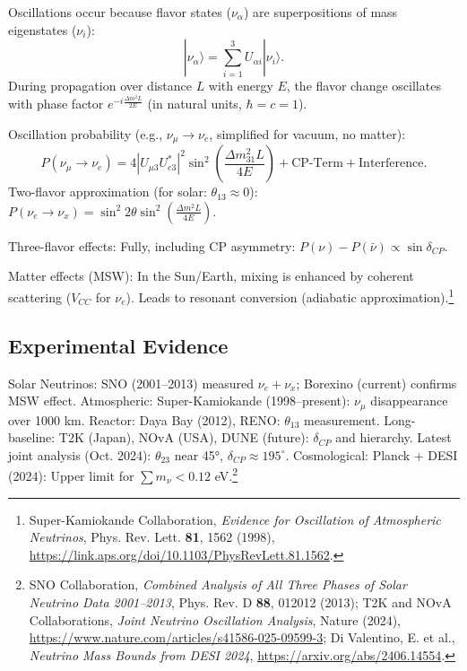 	Oscillations occur because flavor states ($\nu_\alpha$) are superpositions of mass eigenstates ($\nu_i$):
	\begin{equation}
		|\nu_\alpha\rangle = \sum_{i=1}^3 U_{\alpha i} |\nu_i\rangle.
		\label{eq:flavorueberlagerung}
	\end{equation}
	During propagation over distance $L$ with energy $E$, the flavor change oscillates with phase factor $ e^{-i \frac{\Delta m^2 L}{2E}} $ (in natural units, $\hbar=c=1$).
	
	Oscillation probability (e.g., $\nu_\mu \to \nu_e$, simplified for vacuum, no matter):
	\begin{equation}
		P(\nu_\mu \to \nu_e) = 4 |U_{\mu 3} U_{e 3}^*|^2 \sin^2 \left( \frac{\Delta m_{31}^2 L}{4E} \right) + \text{CP-Term} + \text{Interference}.
		\label{eq:oszprob}
	\end{equation}
	Two-flavor approximation (for solar: $\theta_{13}\approx0$): $ P(\nu_e \to \nu_x) = \sin^2 2\theta \sin^2 \left( \frac{\Delta m^2 L}{4E} \right) $.
	
	Three-flavor effects: Fully, including CP asymmetry: $ P(\nu) - P(\bar{\nu}) \propto \sin \delta_{CP} $.
	
	Matter effects (MSW): In the Sun/Earth, mixing is enhanced by coherent scattering ($V_{CC}$ for $\nu_e$). Leads to resonant conversion (adiabatic approximation).\footnote{Super-Kamiokande Collaboration, \emph{Evidence for Oscillation of Atmospheric Neutrinos}, Phys. Rev. Lett. \textbf{81}, 1562 (1998), \url{https://link.aps.org/doi/10.1103/PhysRevLett.81.1562}.}
	
	\subsection{Experimental Evidence}
	
	Solar Neutrinos: SNO (2001--2013) measured $\nu_e + \nu_x$; Borexino (current) confirms MSW effect. Atmospheric: Super-Kamiokande (1998--present): $\nu_\mu$ disappearance over 1000 km. Reactor: Daya Bay (2012), RENO: $\theta_{13}$ measurement. Long-baseline: T2K (Japan), NOvA (USA), DUNE (future): $\delta_{CP}$ and hierarchy. Latest joint analysis (Oct. 2024): $\theta_{23}$ near 45°, $\delta_{CP} \approx 195^\circ$. Cosmological: Planck + DESI (2024): Upper limit for $\sum m_\nu < 0.12$ eV.\footnote{SNO Collaboration, \emph{Combined Analysis of All Three Phases of Solar Neutrino Data 2001--2013}, Phys. Rev. D \textbf{88}, 012012 (2013); T2K and NOvA Collaborations, \emph{Joint Neutrino Oscillation Analysis}, Nature (2024), \url{https://www.nature.com/articles/s41586-025-09599-3}; Di Valentino, E. et al., \emph{Neutrino Mass Bounds from DESI 2024}, \url{https://arxiv.org/abs/2406.14554}.}
	
